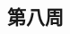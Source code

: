 \documentclass{article}
\begin{document}
\begin{CJK*}{UTF8}{gbsn}
\section{第八周}





\end{CJK*}
\end{document}
